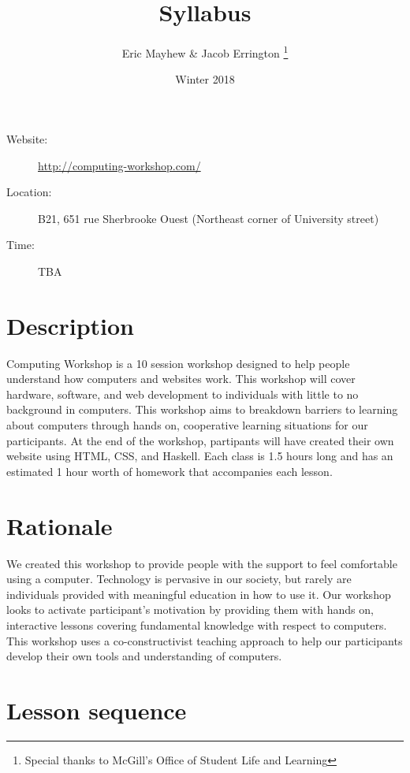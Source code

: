 \documentclass[11pt]{article}
\author{%
  Eric Mayhew \& Jacob Errington%
  \footnote{Special thanks to McGill's Office of Student Life and Learning}
}
\title{Syllabus}
\date{Winter 2018}
\begin{document}
\maketitle

\begin{description}
  \item[Website:]
    \url{http://computing-workshop.com/}

  \item[Location:]
    B21, 651 rue Sherbrooke Ouest
    (Northeast corner of University street)

  \item[Time:]
    TBA
\end{description}

\section*{Description}

Computing Workshop is a 10 session workshop designed to help people understand
how computers and websites work. This workshop will cover hardware, software,
and web development to individuals with little to no background in computers. 
This workshop aims to
breakdown barriers to learning about computers through hands on, cooperative
learning situations for our participants. At the end of the workshop,
partipants will have created their own website using HTML, CSS, and Haskell. Each class is 1.5 hours long
and has an estimated 1 hour worth of homework that accompanies each lesson.

\section*{Rationale}

We created this workshop to provide people with the support to feel comfortable
using a computer. Technology is pervasive in our society, but rarely are
individuals provided with meaningful education in how to use it. Our workshop
looks to activate participant's motivation by providing them with hands on,
interactive lessons covering fundamental knowledge with respect to computers.
This workshop uses a co-constructivist teaching approach to help our
participants develop their own tools and understanding of computers.

\section{Lesson sequence}
\end{document}
